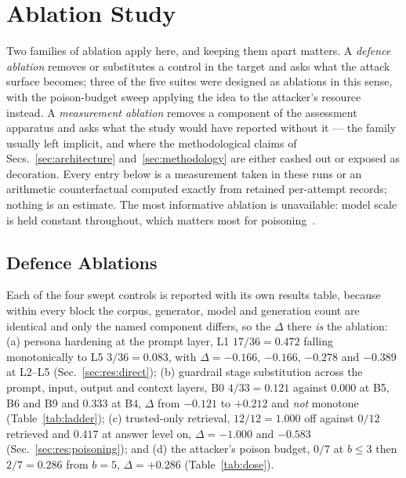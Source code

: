 %
\section{Ablation Study}
\label{sec:ablation}

Two families of ablation apply here, and keeping them apart matters. A
\emph{defence ablation} removes or substitutes a control in the target
and asks what the attack surface becomes; three of the five suites were
designed as ablations in this sense, with the poison-budget sweep
applying the idea to the attacker's resource instead. A
\emph{measurement ablation} removes a component of the assessment
apparatus and asks what the study would have reported without it --- the
family usually left implicit, and where the methodological claims of
Secs.~\ref{sec:architecture} and~\ref{sec:methodology} are either
cashed out or exposed as decoration. Every entry below is a measurement
taken in these runs or an arithmetic counterfactual computed exactly
from retained per-attempt records; nothing is an estimate. The most
informative ablation is unavailable: model scale is held constant
throughout, which matters most for poisoning~\cite[Table~2]{bowen2025scaling}.

\subsection{Defence Ablations}
\label{sec:abl:defence}

Each of the four swept controls is reported with its own results table,
because within every block the corpus, generator, model and generation
count are identical and only the named component differs, so the
$\Delta$ there \emph{is} the ablation: (a) persona hardening at the
prompt layer, L1 $17/36 = 0.472$ falling monotonically to L5
$3/36 = 0.083$, with $\Delta = -0.166$, $-0.166$, $-0.278$ and
$\mathbf{-0.389}$ at L2--L5 (Sec.~\ref{sec:res:direct}); (b) guardrail
stage substitution across
the prompt, input, output and context layers, B0 $4/33 = 0.121$ against
$0.000$ at B5, B6 and B9 and $0.333$ at B4, $\Delta$ from $-0.121$ to
$+0.212$ and \emph{not} monotone (Table~\ref{tab:ladder}); (c)
trusted-only retrieval, $12/12 = 1.000$ off against $0/12$ retrieved
and $0.417$ at answer level on, $\Delta = \mathbf{-1.000}$ and $-0.583$
(Sec.~\ref{sec:res:poisoning}); and (d) the attacker's poison budget,
$0/7$ at $b \le 3$ then $2/7 = 0.286$ from $b = 5$,
$\Delta = +0.286$ (Table~\ref{tab:dose}).

